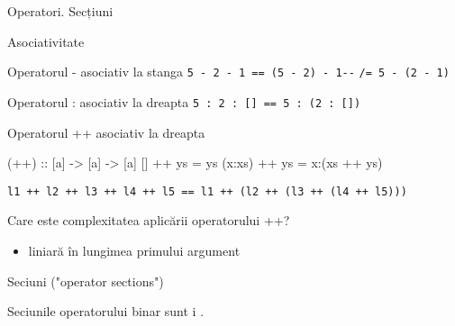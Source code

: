 \documentclass[xcolor=pdftex,romanian,colorlinks]{beamer}
\begin{document}
\begin{section}{Operatori. Secțiuni}
  
  
  
  
  \begin{frame}[fragile]
  {Asociativitate}
  
  \begin{block}
  {Operatorul \alert{-} asociativ la stanga}
  \lstinline$5 - 2 - 1 == (5 - 2) - 1$\hfill \lstinline$--$ \hfill \lstinline$/= 5 - (2 - 1)$
  \end{block}
  
  \begin{block}
  {Operatorul \alert{:} asociativ la dreapta}
  \lstinline$5 : 2 : [] == 5 : (2 : [])$
  \end{block}
  
  \begin{block}
  {Operatorul \alert{++} asociativ la dreapta
  }
  \vspace{-2ex}
  \begin{asciihs}
  (++) :: [a] -> [a] -> [a]
  [] ++ ys = ys
  (x:xs) ++ ys = x:(xs ++ ys)
  \end{asciihs}
  
  \lstinline$l1 ++ l2 ++ l3 ++ l4 ++ l5 == l1 ++ (l2 ++ (l3 ++ (l4 ++ l5)))$
  \end{block}
  
  \begin{block}
  {Care este complexitatea aplicării operatorului \alert{++}?}
  \begin{itemize}
  \item<5->
  liniară în lungimea primului argument
  \end{itemize}
  \end{block}
  \end{frame}
  
  
  
  \begin{frame}[fragile]{Sec\ts iuni ("operator sections")}
  \begin{block}{}
  Sec\ts iunile operatorului binar  sunt
    \sh i .
  

\end{block}
\end{frame}
\end{section}
\end{document}
